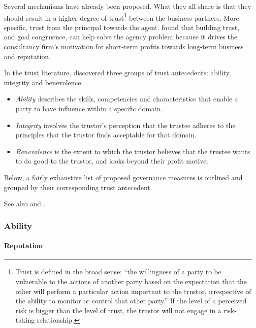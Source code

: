 \documentclass[12pt]{article}
\providecommand{\tightlist}{%
  \setlength{\itemsep}{0pt}\setlength{\parskip}{0pt}}
\begin{document}
Several mechanisms have already been proposed. What they all share is
that they should result in a higher degree of trust\footnote{Trust is
  defined in the broad sense: ``the willingness of a party to be
  vulnerable to the actions of another party based on the expectation
  that the other will perform a particular action important to the
  trustor, irrespective of the ability to monitor or control that other
  party.'' \citep{kee1970} If the level of a perceived risk is bigger
  than the level of trust, the trustor will not engage in a risk-taking
  relationship.} between the business partners. More specific, trust
from the principal towards the agent. \citet[265]{liberatore2010} found
that building trust, and goal congruence, can help solve the agency
problem because it drives the consultancy firm's motivation for
short-term profits towards long-term business and reputation.

In the trust literature, \citet[717-720]{mayer1995} discovered three
groups of trust antecedents: ability, integrity and benevolence.

\begin{itemize}
\tightlist
\item
  \emph{Ability} describes the skills, competencies and characteristics
  that enable a party to have influence within a specific domain.
\item
  \emph{Integrity} involves the trustor's perception that the trustee
  adheres to the principles that the trustor finds acceptable for that
  domain.
\item
  \emph{Benevolence} is the extent to which the trustor believes that
  the trustee wants to do good to the trustor, and looks beyond their
  profit motive.
\end{itemize}

Below, a fairly exhaustive list of proposed governance measures is
outlined and grouped by their corresponding trust antecedent.

See also \citet{lewicki2006} and \citet{kirilov2012}.

\hypertarget{ability}{%
\subsubsection{Ability}\label{ability}}

\hypertarget{reputation}{%
\paragraph{Reputation}\label{reputation}}
\end{document}
